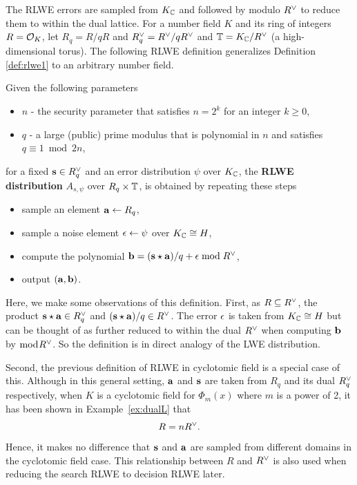\documentclass[../main.tex]{subfiles}
\begin{document}
The RLWE errors are sampled from $K_{\mathbb{C}}$ and followed by modulo $R^{\vee}$ to reduce them to within the dual lattice. For a number field $K$ and its ring of integers $R=\mathcal{O}_K$, let $R_q=R/qR$ and $R^{\vee}_q=R^{\vee}/qR^{\vee}$ and $\mathbb{T} = K_{\mathbb{C}} / R^{\vee}$ (a high-dimensional torus). The following RLWE definition generalizes Definition \ref{def:rlwe1} to an arbitrary number field. 

\begin{definition}
\label{def:rlwe2}
Given the following parameters
\begin{itemize}\itemsep1mm\parskip0mm
    \item $n$ - the security parameter that satisfies $n=2^k$ for an integer $k \ge 0$,
    \item $q$ - a large (public) prime modulus that is polynomial in $n$ and satisfies $q \equiv 1 \bmod 2n$,
\end{itemize}
for a fixed $\mathbf{s} \in R^{\vee}_q$ and an error distribution $\psi$ over $K_{\mathbb{C}}$, the \textbf{RLWE distribution} $A_{s,\psi}$ over $R_q \times \mathbb{T}$,
\reversemarginpar
{}  
is obtained by repeating these steps
\begin{itemize}\itemsep1mm\parskip0mm
    \item sample an element $\mathbf{a} \leftarrow R_q$,
    \item sample a noise element $\mathbf{\epsilon} \leftarrow \psi$ over $K_{\mathbb{C}} \cong H$,
    \item compute the polynomial $\mathbf{b} = (\mathbf{s} \star \mathbf{a})/q + \mathbf{\epsilon} \bmod R^{\vee}$,
    \item output $(\mathbf{a},\mathbf{b})$.
\end{itemize} 
\end{definition}

Here, we make some observations of this definition. First, as $R \subseteq R^{\vee}$, the product $\mathbf{s} \star \mathbf{a} \in R^{\vee}_q$ and $(\mathbf{s} \star \mathbf{a})/q \in R^{\vee}$. The error $\mathbf{\epsilon}$ is taken from $K_{\mathbb{C}} \cong H$ but can be thought of as further reduced to within the dual $R^{\vee}$ when computing $\mathbf{b}$ by $\bmod R^{\vee}$. So the definition is in direct analogy of the LWE distribution. 

Second, the previous definition of RLWE in cyclotomic field is a special case of this. Although in this general setting, $\mathbf{a}$ and $\mathbf{s}$ are taken from $R_q$ and its dual $R^{\vee}_q$ respectively, when $K$ is a cyclotomic field for $\Phi_m(x)$ where $m$ is a power of 2, it has been shown in Example~\ref{ex:dualL} that 
\reversemarginpar
{}
\begin{equation}
\label{eq:scaleRDual}
    R=nR^{\vee}.
\end{equation}
Hence, it makes no difference that $\mathbf{s}$ and $\mathbf{a}$ are sampled from different domains in the cyclotomic field case. This relationship between $R$ and $R^{\vee}$ is also used when reducing the search RLWE to decision RLWE later. 
\end{document}
